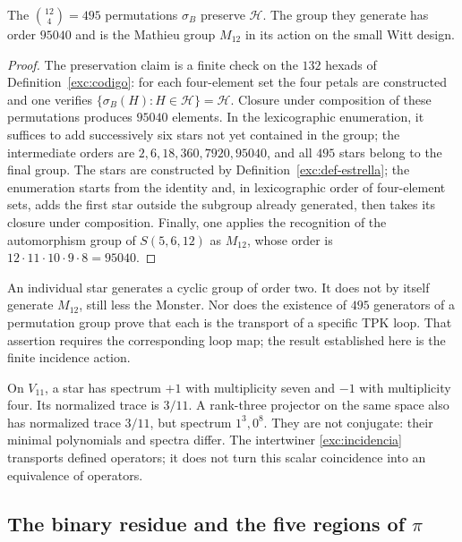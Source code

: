 \begin{proposition}
\label{exc:m12}
The $\binom{12}4=495$ permutations $\sigma_B$ preserve $\mathcal H$.
The group they generate has order $95040$ and is the Mathieu group
$M_{12}$ in its action on the small Witt design.
\end{proposition}

\begin{proof}
The preservation claim is a finite check on the
$132$ hexads of Definition~\ref{exc:codigo}: for each four-element set the
four petals are constructed and one verifies
$\{\sigma_B(H):H\in\mathcal H\}=\mathcal H$.
Closure under composition of these permutations produces $95040$
elements. In the lexicographic enumeration, it suffices to add successively
six stars not yet contained in the group; the intermediate orders
are $2,6,18,360,7920,95040$, and all $495$ stars belong to the final
group. The stars are constructed by
Definition~\ref{exc:def-estrella}; the enumeration starts from the identity
and, in lexicographic order of four-element sets, adds the first star
outside the subgroup already generated, then takes its closure under
composition. Finally, one applies the recognition
of the automorphism group of $S(5,6,12)$ as $M_{12}$, whose order is
$12\cdot11\cdot10\cdot9\cdot8=95040$.
\end{proof}

An individual star generates a cyclic group of order two. It does
not by itself generate $M_{12}$, still less the Monster. Nor does the
existence of $495$ generators of a permutation group prove that
each is the transport of a specific TPK loop. That assertion
requires the corresponding loop map; the result established here
is the finite incidence action.

\begin{remark}
On $V_{11}$, a star has spectrum $+1$ with multiplicity seven
and $-1$ with multiplicity four. Its normalized trace is $3/11$.
A rank-three projector on the same space also has normalized
trace $3/11$, but spectrum $1^3,0^8$. They are not conjugate: their
minimal polynomials and spectra differ. The intertwiner
\eqref{exc:incidencia} transports defined operators; it does not turn
this scalar coincidence into an equivalence of operators.
\end{remark}

\subsection{The binary residue and the five regions of \texorpdfstring{$\pi$}{pi}}
\label{exc:cinco-regiones}

